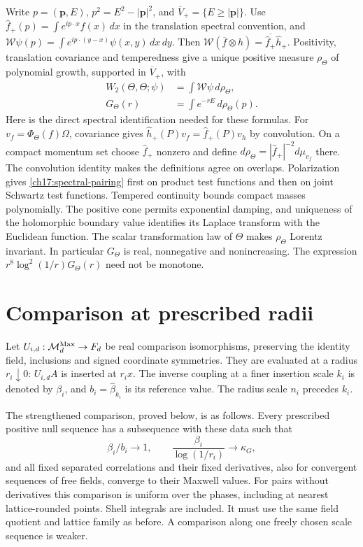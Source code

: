 Write $p=(\boldsymbol p,E)$, $p^2=E^2-|\boldsymbol p|^2$, and
$\overline V_+=\{E\ge|\boldsymbol p|\}$. Use
$\widehat f_+(p)=\int e^{ip\cdot x}f(x)\,dx$ in the translation
spectral convention, and
$\mathcal W\psi(p)=\int e^{ip\cdot(y-x)}\psi(x,y)\,dx\,dy$.
Then $\mathcal W(\overline f\otimes h)=
\overline{\widehat f_+}\widehat h_+$.
Positivity, translation covariance and temperedness give a unique
positive measure $\rho_\Theta$ of polynomial growth, supported in
$\overline V_+$, with
\begin{align}
 W_2(\Theta,\Theta;\psi)&=\int\mathcal W\psi\,d\rho_\Theta,
 \label{ch17:spectral-pairing}\\
 G_\Theta(r)&=\int e^{-rE}\,d\rho_\Theta(p).
 \label{ch17:laplace}
\end{align}
Here is the direct spectral identification needed for these formulas.
For $v_f=\Phi_\Theta(f)\Omega$, covariance gives
$\widehat h_+(P)v_f=\widehat f_+(P)v_h$ by convolution.
On a compact momentum set choose $\widehat f_+$ nonzero and define
$d\rho_\Theta=|\widehat f_+|^{-2}d\mu_{v_f}$ there. The convolution
identity makes the definitions agree on overlaps. Polarization gives
\eqref{ch17:spectral-pairing} first on product test functions and then on joint
Schwartz test functions. Tempered continuity bounds compact masses polynomially.
The positive cone permits exponential damping, and uniqueness of the
holomorphic boundary value identifies its Laplace transform with the
Euclidean function. The scalar transformation law of $\Theta$ makes
$\rho_\Theta$ Lorentz invariant. In particular $G_\Theta$ is real,
nonnegative and nonincreasing. The expression
$r^8\log^2(1/r)G_\Theta(r)$ need not be monotone.

\section{Comparison at prescribed radii}
\label{ch17:radii}

Let $U_{i,d}:\mathcal M_d^{\rm Max}\to F_d$ be real comparison
isomorphisms, preserving the identity field, inclusions and signed coordinate
symmetries. They are evaluated at a radius $r_i\downarrow0$:
$U_{i,d}A$ is inserted at $r_ix$. The inverse coupling at a
finer insertion scale $k_i$ is denoted by $\beta_i$, and
$b_i=\widehat\beta_{k_i}$ is its reference value. The radius scale
$n_i$ precedes $k_i$.

The strengthened comparison, proved below, is as follows. Every prescribed
positive null sequence has a subsequence with these data such that
\begin{equation}
 \beta_i/b_i\to1,\qquad
 \frac{\beta_i}{\log(1/r_i)}\to\kappa_G,
 \label{ch17:running-radius}
\end{equation}
and all fixed separated correlations and their fixed derivatives,
also for convergent sequences of free fields, converge to their Maxwell values.
For pairs without derivatives this comparison is uniform over the
phases, including at nearest lattice-rounded points. Shell integrals are
included. It must use the same field quotient and lattice family as
before. A comparison along one freely chosen scale sequence is weaker.

